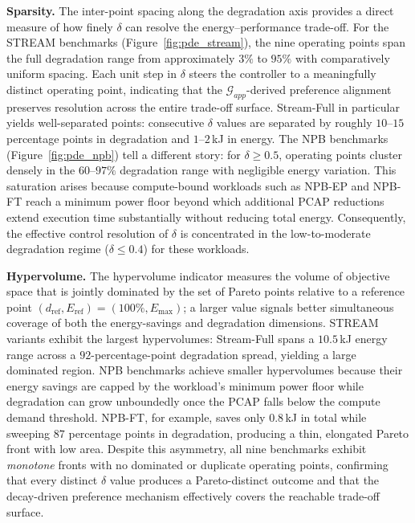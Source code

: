 \noindent\textbf{Sparsity.}
The inter-point spacing along the degradation axis provides a direct measure of how finely $\delta$ can resolve the energy--performance trade-off. For the STREAM benchmarks (Figure~\ref{fig:pde_stream}), the nine operating points span the full degradation range from approximately $3\%$ to $95\%$ with comparatively uniform spacing. Each unit step in $\delta$ steers the controller to a meaningfully distinct operating point, indicating that the $\mathcal{G}_{app}$-derived preference alignment preserves resolution across the entire trade-off surface. Stream-Full in particular yields well-separated points: consecutive $\delta$ values are separated by roughly $10$--$15$ percentage points in degradation and $1$--$2$\,kJ in energy. The NPB benchmarks (Figure~\ref{fig:pde_npb}) tell a different story: for $\delta \geq 0.5$, operating points cluster densely in the $60$--$97\%$ degradation range with negligible energy variation. This saturation arises because compute-bound workloads such as NPB-EP and NPB-FT reach a minimum power floor beyond which additional PCAP reductions extend execution time substantially without reducing total energy. Consequently, the effective control resolution of $\delta$ is concentrated in the low-to-moderate degradation regime ($\delta \leq 0.4$) for these workloads.

\noindent\textbf{Hypervolume.}
The hypervolume indicator measures the volume of objective space that is jointly dominated by the set of Pareto points relative to a reference point $(d_\text{ref}, E_\text{ref}) = (100\%, E_\text{max})$; a larger value signals better simultaneous coverage of both the energy-savings and degradation dimensions. STREAM variants exhibit the largest hypervolumes: Stream-Full spans a $10.5$\,kJ energy range across a $92$-percentage-point degradation spread, yielding a large dominated region. NPB benchmarks achieve smaller hypervolumes because their energy savings are capped by the workload's minimum power floor while degradation can grow unboundedly once the PCAP falls below the compute demand threshold. NPB-FT, for example, saves only $0.8$\,kJ in total while sweeping $87$ percentage points in degradation, producing a thin, elongated Pareto front with low area. Despite this asymmetry, all nine benchmarks exhibit \emph{monotone} fronts with no dominated or duplicate operating points, confirming that every distinct $\delta$ value produces a Pareto-distinct outcome and that the decay-driven preference mechanism effectively covers the reachable trade-off surface.

